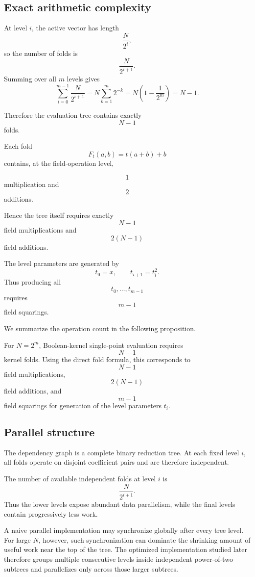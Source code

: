 \subsection{Exact arithmetic complexity}

At level \(i\), the active vector has length
\[
\frac{N}{2^i},
\]
so the number of folds is
\[
\frac{N}{2^{i+1}}.
\]
Summing over all \(m\) levels gives
\[
\sum_{i=0}^{m-1}
\frac{N}{2^{i+1}}
=
N
\sum_{k=1}^{m}
2^{-k}
=
N\left(1-\frac{1}{2^m}\right)
=
N-1.
\]

Therefore the evaluation tree contains exactly
\[
\boxed{N-1}
\]
folds.

Each fold
\[
F_t(a,b)=t(a+b)+b
\]
contains, at the field-operation level,

\[
1
\]
multiplication and
\[
2
\]
additions.

Hence the tree itself requires exactly
\[
\boxed{N-1}
\]
field multiplications and
\[
\boxed{2(N-1)}
\]
field additions.

The level parameters are generated by
\[
t_0=x,
\qquad
t_{i+1}=t_i^2.
\]
Thus producing all
\[
t_0,\ldots,t_{m-1}
\]
requires
\[
\boxed{m-1}
\]
field squarings.

We summarize the operation count in the following proposition.

\begin{proposition}
\label{prop:operation-count}
For \(N=2^m\), Boolean-kernel single-point evaluation requires
\[
N-1
\]
kernel folds.  Using the direct fold formula, this corresponds to
\[
N-1
\]
field multiplications,
\[
2(N-1)
\]
field additions, and
\[
m-1
\]
field squarings for generation of the level parameters \(t_i\).
\end{proposition}

\subsection{Parallel structure}

The dependency graph is a complete binary reduction tree.  At each fixed
level \(i\), all folds operate on disjoint coefficient pairs and are
therefore independent.

The number of available independent folds at level \(i\) is
\[
\frac{N}{2^{i+1}}.
\]
Thus the lower levels expose abundant data parallelism, while the final
levels contain progressively less work.

A naive parallel implementation may synchronize globally after every tree
level.  For large \(N\), however, such synchronization can dominate the
shrinking amount of useful work near the top of the tree.  The optimized
implementation studied later therefore groups multiple consecutive levels
inside independent power-of-two subtrees and parallelizes only across
those larger subtrees.


